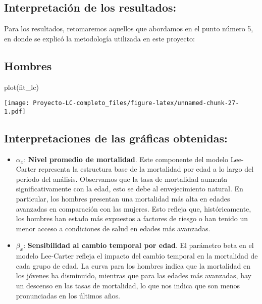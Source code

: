 \documentclass[
]{article}
\newenvironment{Shaded}{\begin{snugshade}}{\end{snugshade}}
\newcommand{\FunctionTok}[1]{\textcolor[rgb]{0.00,0.00,0.00}{#1}}
\newcommand{\NormalTok}[1]{#1}
\begin{document}
\hypertarget{interpretaciuxf3n-de-los-resultados}{%
\subsection{Interpretación de los
resultados:}\label{interpretaciuxf3n-de-los-resultados}}

Para los resultados, retomaremos aquellos que abordamos en el punto
número 5, en donde se explicó la metodología utilizada en este proyecto:

\hypertarget{hombres-2}{%
\subsection{Hombres}\label{hombres-2}}

\begin{Shaded}
\begin{Highlighting}[]
\FunctionTok{plot}\NormalTok{(fit\_lc)}
\end{Highlighting}
\end{Shaded}

\texttt{[image: Proyecto-LC-completo\_files/figure-latex/unnamed-chunk-27-1.pdf]}

\hypertarget{interpretaciones-de-las-gruxe1ficas-obtenidas}{%
\subsection{Interpretaciones de las gráficas
obtenidas:}\label{interpretaciones-de-las-gruxe1ficas-obtenidas}}

\begin{itemize}
\item
  \(\alpha_x\): \textbf{Nivel promedio de mortalidad}. Este componente
  del modelo Lee-Carter representa la estructura base de la mortalidad
  por edad a lo largo del periodo del análisis. Observamos que la tasa
  de mortalidad aumenta significativamente con la edad, esto se debe al
  envejecimiento natural. En particular, los hombres presentan una
  mortalidad más alta en edades avanzadas en comparación con las
  mujeres. Esto refleja que, históricamente, los hombres han estado más
  expuestos a factores de riesgo o han tenido un menor acceso a
  condiciones de salud en edades más avanzadas.
\item
  \(\beta_x\): \textbf{Sensibilidad al cambio temporal por edad}. El
  parámetro beta en el modelo Lee-Carter refleja el impacto del cambio
  temporal en la mortalidad de cada grupo de edad. La curva para los
  hombres indica que la mortalidad en los jóvenes ha disminuido,
  mientras que para las edades más avanzadas, hay un descenso en las
  tasas de mortalidad, lo que nos indica que son menos pronunciadas en
  los últimos años.
\end{itemize}
\end{document}

